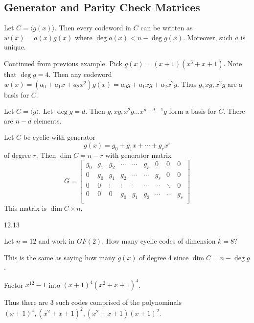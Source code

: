 \documentclass{article}
\begin{document}
\subsection{Generator and Parity Check Matrices}
\begin{theorem}
  Let \( C = \langle g(x) \rangle\).
  Then every codeword in \( C \) can be written as \( w(x) = a(x)g(x) \) where \( \deg a(x) < n - \deg g(x) \). Moreover, such \( a  \) is unique.
\end{theorem}
\begin{example}
  Continued from previous example. Pick \( g(x) = (x+1)(x^3+x+1) \). Note that \( \deg g = 4 \). Then any codeword \( w(x) = (a_0 + a_1x + a_2x^2)g(x) = a_0g + a_1xg + a_2x^2g \). Thus \( g, xg, x^2g \) are a basis for \( C \).
\end{example}
\begin{theorem}
  Let \( C = \langle g \rangle \). Let \( \deg g = d \).  Then \( g, xg, x^2g \dots x^{n-d-1}g  \) form a basis for \( C  \). There are \( n-d  \) elements.
\end{theorem}
\begin{theorem}\label{foo}
  Let \( C  \) be cyclic with generator \[
    g(x) = g_0 + g_1x + \cdots  + g_rx^r
  \] of degree \( r  \). Then \( \dim C = n - r \) with generator matrix \[
    G =
    \begin{bmatrix}
      g_0 & g_1 & g_2 & \cdots&  \cdots & g_r & 0 & 0 & 0\\
      0 & g_0 & g_1 & g_2 & \cdots&  \cdots & g_r & 0 & 0\\
      0 & 0 & \vdots & \vdots & \vdots & \cdots&  \cdots & \ddots & 0\\
      0 & 0 & 0 & g_0 & g_1 & g_2 & \cdots&  \cdots & g_r\\
    \end{bmatrix}
  \]
  This matrix is \( \dim C \times n \).
\end{theorem}
\begin{example}
  12.13
\end{example}
\begin{example}
  Let \( n=12 \) and work in \( GF(2) \). How many cyclic codes of dimension \( k=8 \)?

  This is the same as saying how many \( g(x) \) of degree 4 since \( \dim C = n - \deg g \).

  Factor \( x^{12} - 1 \) into \( (x+1)^4(x^2+x+1)^4 \).

  Thus there are 3 such codes comprised of the polynominals \( (x+1)^4, (x^2+x+1)^2, (x^2+x+1)(x+1)^2 \).
\end{example}
\end{document}
